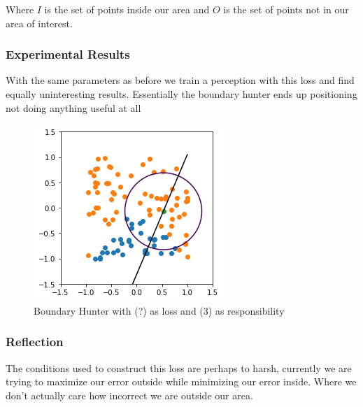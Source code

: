 \documentclass{article}
\theoremstyle{definition}
\begin{document}
Where $I$ is the set of points inside our area and $O$ is the set of points not in our area of interest.

\subsubsection{Experimental Results}

With the same parameters as before we train a perception with this loss and find equally uninteresting results. Essentially the boundary hunter ends up positioning not doing anything useful at all

\begin{figure}[H]
\centering
  \begin{minipage}[b]{0.4\textwidth}
    \includegraphics[width=\textwidth]{BoundaryHunter-Attempt2-01.png}
    \caption{Boundary Hunter with (?) as loss and (3) as responsibility}
  \end{minipage}
  \hfill
\end{figure}

\subsubsection{Reflection}
The conditions used to construct this loss are perhaps to harsh, currently we are trying to maximize our error outside while minimizing our error inside. Where we don't actually care how incorrect we are outside our area.
\end{document}
